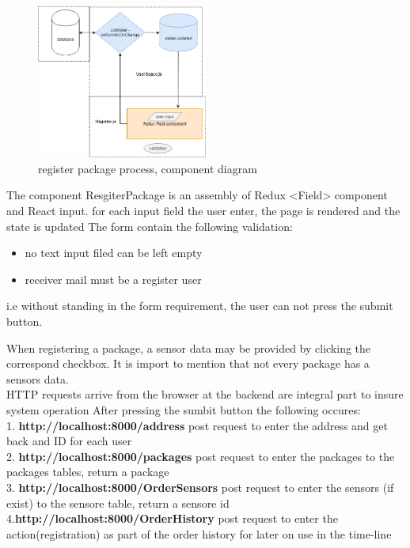 \begin{figure}[!ht]
	\centering
	\includegraphics[width=0.5\textwidth]{images/register.jpg}
	\caption{register package process, component diagram}
	\label{fig:}
\end{figure}


The component ResgiterPackage is an assembly of Redux <Field> component and React input.
for each input field the user enter, the page is rendered and the state is updated
The form contain the following validation:
\begin{itemize}
\item no text input filed can be left empty 
\item receiver mail must be a register user
\end{itemize}
i.e without standing in the form requirement, the user can not press the submit button.

When registering a package, a sensor data may be provided by clicking the correspond checkbox. It is import to mention that not every package has a sensors data.\\
HTTP requests arrive from the browser at the backend are integral part to insure system operation
After pressing the sumbit button the following occures:\\
1. \textbf{http://localhost:8000/address} post request to enter the address and get back and ID for each user\\
2. \textbf {http://localhost:8000/packages}  post request to enter the packages to the packages tables, return a package \\
3. \textbf {http://localhost:8000/OrderSensors}  post request to enter the sensors (if exist)  to the sensore table, return a sensore id\\
4.\textbf {http://localhost:8000/OrderHistory}  post request to enter the action(registration) as part of the order history for later on use in the time-line\\